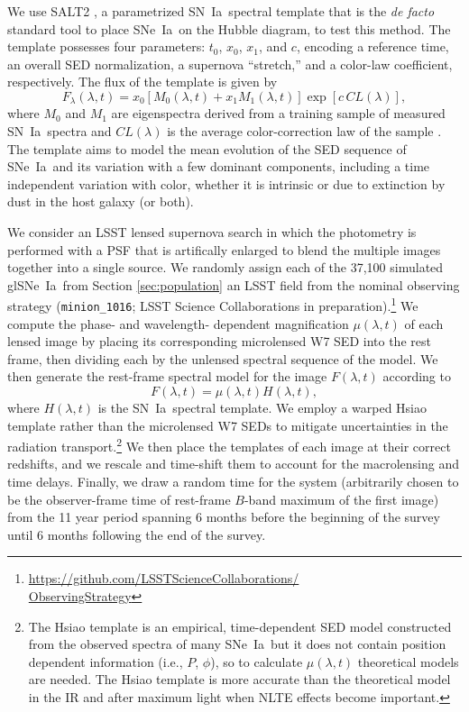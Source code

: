 \documentclass[iop,apj,numberedappendix,twocolappendix]{emulateapj}
\newcommand{\snia}{{\rm SN~Ia}}
\newcommand{\sneia}{{\rm SNe~Ia}}
\begin{document}
We use SALT2 \citep{salt2}, a parametrized \snia\ spectral template that is the \textit{de facto} standard tool to place \sneia\ on the Hubble diagram, to test this method.
The template possesses four parameters: $t_0$, $x_0$, $x_1$, and $c$, encoding a reference time, an overall SED normalization, a supernova ``stretch,'' and a color-law coefficient, respectively.
The flux of the template is given by 
\begin{equation}
F_\lambda(\lambda, t) = x_0 [M_0(\lambda, t) + x_1 M_1(\lambda, t)] \exp[c\,CL(\lambda)],
\end{equation}
where $M_0$ and $M_1$ are eigenspectra derived from a training sample of measured \snia\ spectra and $CL(\lambda)$ is the average color-correction law of the sample \citep[see][for details]{salt2}. 
The template aims to model the mean evolution of the SED sequence of \sneia\ and its variation with a few dominant components, including a time independent variation with color, whether it is intrinsic or due to extinction by dust in the host galaxy (or both).

We consider an LSST lensed supernova search in which the photometry is performed with a PSF that is artifically enlarged to blend the multiple images together into a single source.
We randomly assign each of the 37,100 simulated gl\sneia\ from Section \ref{sec:population} an LSST field from the nominal observing strategy (\texttt{minion\_1016}; LSST Science Collaborations in preparation).\footnote{\href{https://github.com/LSSTScienceCollaborations/ObservingStrategy}{https://github.com/LSSTScienceCollaborations/\\ObservingStrategy}}
We compute the phase- and wavelength- dependent magnification $\mu(\lambda, t)$ of each lensed image by placing its corresponding microlensed W7 SED into the rest frame, then  dividing each by the unlensed spectral sequence of the model.
We then generate the rest-frame spectral model for the image $F(\lambda, t)$ according to 
\begin{equation}
	\label{eq:hsiao}
	F(\lambda, t) = \mu(\lambda, t) H(\lambda, t),
\end{equation}
where $H(\lambda, t)$ is the \cite{hsiao} \snia\ spectral template.
We employ a warped Hsiao template rather than the microlensed W7 SEDs to mitigate uncertainties in the radiation transport.\footnote{The Hsiao template is an empirical, time-dependent SED model constructed from the observed spectra of many \sneia\, but it does not contain position dependent information (i.e., $P$, $\phi$), so to calculate $\mu(\lambda, t)$ theoretical models are needed.
The Hsiao template is more accurate than the theoretical model in the IR and after maximum light when NLTE effects become important.}
We then place the templates of each image at their correct redshifts, and we rescale and time-shift them to account for the macrolensing and time delays.
Finally, we draw a random time for the system (arbitrarily chosen to be the observer-frame time of rest-frame $B$-band maximum of the first image) from the 11 year period spanning 6 months before the beginning of the survey until 6 months following the end of the survey.
\end{document}
